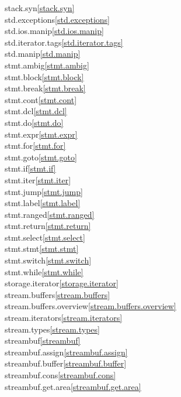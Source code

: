 \begin{multicols}{2}
stack.syn\quad\ref{stack.syn}\\
std.exceptions\quad\ref{std.exceptions}\\
std.ios.manip\quad\ref{std.ios.manip}\\
std.iterator.tags\quad\ref{std.iterator.tags}\\
std.manip\quad\ref{std.manip}\\
stmt.ambig\quad\ref{stmt.ambig}\\
stmt.block\quad\ref{stmt.block}\\
stmt.break\quad\ref{stmt.break}\\
stmt.cont\quad\ref{stmt.cont}\\
stmt.dcl\quad\ref{stmt.dcl}\\
stmt.do\quad\ref{stmt.do}\\
stmt.expr\quad\ref{stmt.expr}\\
stmt.for\quad\ref{stmt.for}\\
stmt.goto\quad\ref{stmt.goto}\\
stmt.if\quad\ref{stmt.if}\\
stmt.iter\quad\ref{stmt.iter}\\
stmt.jump\quad\ref{stmt.jump}\\
stmt.label\quad\ref{stmt.label}\\
stmt.ranged\quad\ref{stmt.ranged}\\
stmt.return\quad\ref{stmt.return}\\
stmt.select\quad\ref{stmt.select}\\
stmt.stmt\quad\ref{stmt.stmt}\\
stmt.switch\quad\ref{stmt.switch}\\
stmt.while\quad\ref{stmt.while}\\
storage.iterator\quad\ref{storage.iterator}\\
stream.buffers\quad\ref{stream.buffers}\\
stream.buffers.overview\quad\ref{stream.buffers.overview}\\
stream.iterators\quad\ref{stream.iterators}\\
stream.types\quad\ref{stream.types}\\
streambuf\quad\ref{streambuf}\\
streambuf.assign\quad\ref{streambuf.assign}\\
streambuf.buffer\quad\ref{streambuf.buffer}\\
streambuf.cons\quad\ref{streambuf.cons}\\
streambuf.get.area\quad\ref{streambuf.get.area}\\

\end{multicols}
